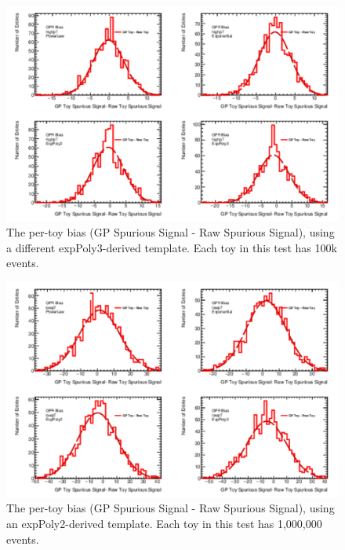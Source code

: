 \begin{figure} 
\begin{center}
  \includegraphics[width=\textwidth]{figures/background/gpr/validation/nominal/ToyTest_FitSigBiases_highpT_100k_noSig}   
\caption{The per-toy bias (GP Spurious Signal - Raw Spurious Signal), using a different expPoly3-derived template. Each toy in this test has 100k events.}
\label{fig:bias_highpt_100k_noSig}
\end{center}
\end{figure}

\begin{figure} 
\begin{center}
  \includegraphics[width=\textwidth]{figures/background/gpr/validation/nominal/ToyTest_FitSigBiases_lowpT_1M_noSig}   
\caption{The per-toy bias (GP Spurious Signal - Raw Spurious Signal), using an expPoly2-derived template. Each toy in this test has 1,000,000 events.}
\label{fig:bias_lowpt_1M_noSig}
\end{center}
\end{figure}

